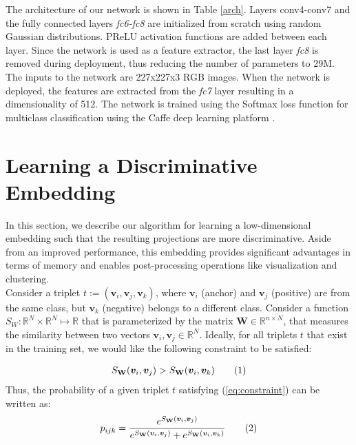 \documentclass[10pt,twocolumn,letterpaper]{article}
\newcommand{\mbf}[1]{\ensuremath{\mathbf{#1}}}
\newcommand*\tageq{\refstepcounter{equation}\tag{\theequation}}
\begin{document}
The architecture of our network is shown in Table \ref{arch}. Layers
conv4-conv7 and the fully connected layers \textit{fc6-fc8} are initialized from
scratch using random Gaussian distributions. PReLU activation functions are added
between each layer. Since the network is used as a feature extractor, the last
layer \textit{fc8} is removed during deployment, thus reducing the number of
parameters to 29M. The inputs to the network are 227x227x3 RGB images. When the
network is deployed, the features are extracted from the \textit{fc7} layer
resulting in a dimensionality of 512. The network is trained using the Softmax
loss function for multiclass classification using the Caffe deep learning
platform \cite{caffe}. 


 \section{Learning a Discriminative Embedding}\label{tpe}
In this section, we describe our algorithm for learning a low-dimensional
embedding such that the resulting projections are more discriminative. Aside
from an improved performance, this embedding provides significant advantages in
terms of memory and enables post-processing operations like visualization and clustering. \\

Consider a triplet $t:=(\bm{v}_i,\bm{v}_j,\bm{v}_k)$, where $\bm{v}_i$ (anchor)
and $\bm{v}_j$ (positive) are from the same class, but $\bm{v}_k$ (negative)
belongs to a different class. Consider a function $S_W:\mathbb{R}^N \times
\mathbb{R}^N \mapsto \mathbb{R}$ that is parameterized by the matrix $\mbf{W}
\in \mathbb{R}^{n \times N}$, that measures the similarity between two vectors
$\bm{v}_i,\bm{v}_j \in \mathbb{R}^N$. Ideally, for all triplets $t$ that exist
in the training set, we would like the following constraint to be satisfied: 

\vspace{-5mm}
\begin{align*}
  S_\mbf{W}(\bm{v}_i,\bm{v}_j)> S_\mbf{W}(\bm{v}_i,\bm{v}_k)
\tageq \label{eq:constraint}
\end{align*}
Thus, the probability of a given triplet $t$ satisfying (\ref{eq:constraint}) can be written as:
\vspace{-2.5mm}
\begin{align*}
  p_{ijk}=\frac{e^{S_\mbf{W}(\bm{v}_i,\bm{v}_j)}}{e^{S_\mbf{W}(\bm{v}_i,\bm{v}_j)} + e^{S_\mbf{W}(\bm{v}_i,\bm{v}_k)}}
\tageq \label{eq:prob}
\end{align*}
\end{document}
